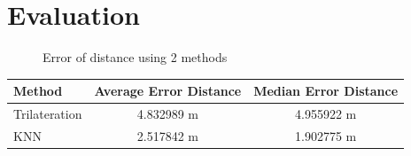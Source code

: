 \documentclass[12pt, conference]{IEEEtran}
\begin{document}
\section{Evaluation}
\begin{figure}[htbp]
  \centering
  \caption{Error of distance using 2 methods}
  \label{fig: Comparison}
\end{figure}

\begin{table}[htbp]
  \begin{tabular}{|l|c|c|}
  \hline
  Method        & Average Error Distance & Median Error Distance \\ \hline
  Trilateration & 4.832989 m             & 4.955922 m            \\ \hline
  KNN           & 2.517842 m             & 1.902775 m            \\ \hline
  \end{tabular}
\end{table}

\end{document}
